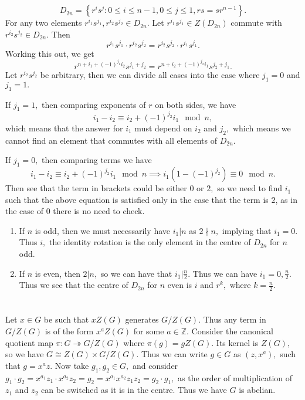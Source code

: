 \documentclass{article}
\begin{document}
\section{} %
$$D_{2n}= \left\{ r^is^j : 0 \leq i \leq n-1, 0 \leq j \leq 1, rs=sr^{n-1} \right\}.$$
For any two elements $r^{i_1}s^{j_1}, r^{i_2}s^{j_2} \in D_{2n}.$ %
Let $r^{i_1}s^{j_1} \in Z(D_{2n})$ commute with $r^{i_2}s^{j_2} \in D_{2n}.$ Then $$r^{i_1}s^{j_1} \cdot r^{i_2}s^{j_2}= 
r^{i_2}s^{j_2} \cdot r^{i_1}s^{j_1}.$$
Working this out, we get $$r^{n+i_1+(-1)^{j_1}i_2} s^{j_1+j_2}=r^{n+i_2+(-1)^{j_2}i_1} s^{j_2+j_1}. $$ Let $r^{i_2}s^{j_2}$ be arbitrary, then we can divide 
all cases into the case where $j_1=0$ and $j_1=1.$ 

If $j_1=1,$ then comparing exponents of $r$ on both sides, we have $$i_1-i_2\equiv i_2+ (-1)^{j_2}i_1 \mod n,$$ which means that the answer for $i_1$ must 
depend on $i_2$ and $j_2,$ which means we cannot find an element that commutes with all elements of $D_{2n}.$ 

If $j_1=0,$ then comparing terms we have $$i_1-i_2 \equiv i_2 + (-1)^{j_2}i_1 \mod n \implies i_1(1-(-1)^{j_2})\equiv 0 \mod n.$$
Then see that the term in brackets could be either $0$ or $2,$ so we need to find $i_1$ such that the above equation is satisfied only in the case that 
the term is $2$, as in the case of $0$ there is no need to check. 
\begin{enumerate}
	\item If $n$ is odd, then we must necessarily have $i_1|n$ as $2 \nmid n,$ implying that $i_1=0.$ Thus $i,$ the identity rotation is the only element in 
	the centre of $D_{2n}$ for $n$ odd.
	\item If $n$ is even, then $2|n,$ so we can have that $i_1|\frac{n}{2}.$ Thus we can have $i_1=0, \frac{n}{2}.$ Thus we see that the centre of $D_{2n}$ 
	for $n$ even is $i$ and $r^k,$ where $k=\frac{n}{2}.$
\end{enumerate}
\section{} %
Let $x \in G$ be such that $xZ(G)$ generates $G/Z(G).$ Thus any term in $G/Z(G)$ is of the form $x^aZ(G)$ for some $a \in \mathbb{Z}.$ Consider the 
canonical quotient map $\pi: G \twoheadrightarrow G/Z(G)$ where $\pi(g)=gZ(G).$ Its kernel is $Z(G),$ so we have $G \cong Z(G) \times G/Z(G).$ Thus we can 
write $g \in G$ as $(z,x^a),$ such that $g=x^az.$ Now take $g_1,g_2 \in G,$ and consider $g_1 \cdot g_2=x^{a_1}z_1 \cdot x^{a_2}z_2=g_2=x^{a_1} 
x^{a_2}z_1z_2=g_2 \cdot g_1,$ as the order of multiplication of $z_1$ and $z_2$ can be switched as it is in the centre. Thus we have $G$ is abelian.  
\end{document}
